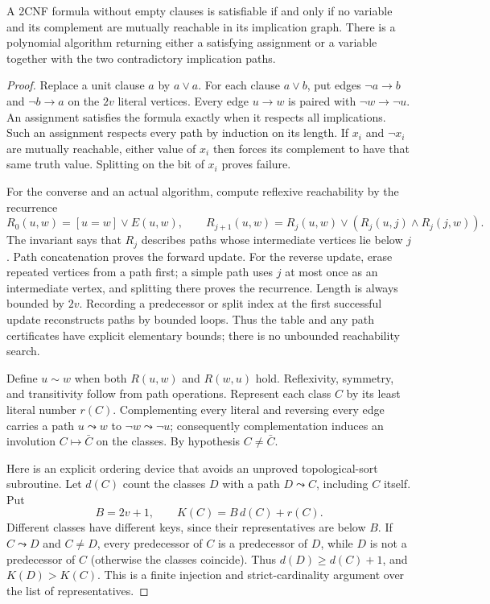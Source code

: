 \begin{theorem}\label{thm:N13}
A 2CNF formula without empty clauses is satisfiable if and only if no variable
and its complement are mutually reachable in its implication graph. There is
a polynomial algorithm returning either a satisfying assignment or a
variable together with the two contradictory implication paths.
\end{theorem}
\begin{proof}
Replace a unit clause $a$ by $a\vee a$. For each clause $a\vee b$, put edges
$\neg a\to b$ and $\neg b\to a$ on the $2v$ literal vertices. Every edge
$u\to w$ is paired with $\neg w\to\neg u$. An assignment satisfies the
formula exactly when it respects all implications. Such an assignment
respects every path by induction on its length. If $x_i$ and $\neg x_i$
are mutually reachable, either value of $x_i$ then forces its complement to
have that same truth value. Splitting on the bit of $x_i$ proves failure.

For the converse and an actual algorithm, compute reflexive reachability by
the recurrence
\[
 R_0(u,w)=[u=w]\vee E(u,w),\qquad
 R_{j+1}(u,w)=R_j(u,w)\vee(R_j(u,j)\wedge R_j(j,w)).
\]
The invariant says that $R_j$ describes paths whose intermediate vertices
lie below $j$. Path concatenation proves the forward update. For the reverse
update, erase repeated vertices from a path first; a simple path uses $j$
at most once as an intermediate vertex, and splitting there proves the
recurrence. Length is always bounded by $2v$. Recording a predecessor or
split index at the first successful update reconstructs paths by bounded
loops. Thus the table and any path certificates have explicit elementary
bounds; there is no unbounded reachability search.

Define $u\sim w$ when both $R(u,w)$ and $R(w,u)$ hold. Reflexivity,
symmetry, and transitivity follow from path operations. Represent each class
$C$ by its least literal number $r(C)$. Complementing every literal and
reversing every edge carries a path $u\leadsto w$ to
$\neg w\leadsto\neg u$; consequently complementation induces an involution
$C\mapsto\bar C$ on the classes. By hypothesis $C\ne\bar C$.

Here is an explicit ordering device that avoids an unproved topological-sort
subroutine. Let $d(C)$ count the classes $D$ with a path $D\leadsto C$,
including $C$ itself. Put
\[
 B=2v+1,\qquad K(C)=B\,d(C)+r(C).
\]
Different classes have different keys, since their representatives are below
$B$. If $C\leadsto D$ and $C\ne D$, every predecessor of $C$ is a predecessor
of $D$, while $D$ is not a predecessor of $C$ (otherwise the classes coincide).
Thus $d(D)\ge d(C)+1$, and $K(D)>K(C)$. This is a finite injection and
strict-cardinality argument over the list of representatives.


\end{proof}
